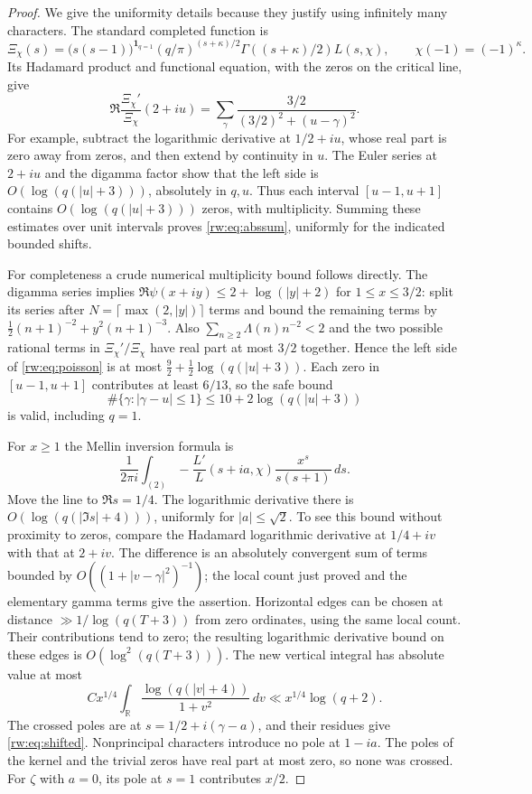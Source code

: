 \begin{proof}
We give the uniformity details because they justify using infinitely many
characters. The standard completed function is
\[
 \Xi_\chi(s)=\bigl(s(s-1)\bigr)^{\mathbf1_{q=1}}
 (q/\pi)^{(s+\kappa)/2}\Gamma((s+\kappa)/2)L(s,\chi),
 \qquad \chi(-1)=(-1)^\kappa.
\]
Its Hadamard product and functional equation, with the zeros on the
critical line, give
\begin{equation}\label{rw:eq:poisson}
 \Re\frac{\Xi_\chi'}{\Xi_\chi}(2+iu)
 =\sum_\gamma\frac{3/2}{(3/2)^2+(u-\gamma)^2}.
\end{equation}
For example, subtract the logarithmic derivative at $1/2+iu$, whose real
part is zero away from zeros, and then extend by continuity in $u$.
The Euler series at $2+iu$ and the digamma factor show that the left side
is $O(\log(q(|u|+3)))$, absolutely in $q,u$. Thus each interval
$[u-1,u+1]$ contains $O(\log(q(|u|+3)))$ zeros, with multiplicity.
Summing these estimates over unit intervals proves
\eqref{rw:eq:abssum}, uniformly for the indicated bounded shifts.

For completeness a crude numerical multiplicity bound follows directly.
The digamma series implies
$\Re\psi(x+iy)\le2+\log(|y|+2)$ for $1\le x\le3/2$:
split its series after $N=\lceil\max(2,|y|)\rceil$ terms and bound the
remaining terms by $\tfrac12(n+1)^{-2}+y^2(n+1)^{-3}$.
Also $\sum_{n\ge2}\Lambda(n)n^{-2}<2$ and the two possible rational
terms in $\Xi_\chi'/\Xi_\chi$ have real part at most $3/2$ together.
Hence the left side of \eqref{rw:eq:poisson} is at most
$\tfrac92+\tfrac12\log(q(|u|+3))$. Each zero in $[u-1,u+1]$ contributes
at least $6/13$, so the safe bound
\begin{equation}\label{rw:eq:localcount}
 \#\{\gamma:|\gamma-u|\le1\}
 \le10+2\log(q(|u|+3))
\end{equation}
is valid, including $q=1$.

For $x\ge1$ the Mellin inversion formula is
\[
 \frac1{2\pi i}\int_{(2)}
 -\frac{L'}{L}(s+ia,\chi)\frac{x^s}{s(s+1)}\,ds.
\]
Move the line to $\Re s=1/4$. The logarithmic derivative there is
$O(\log(q(|\Im s|+4)))$, uniformly for $|a|\le\sqrt2$.
To see this bound without proximity to zeros, compare the Hadamard
logarithmic derivative at $1/4+iv$ with that at $2+iv$. The difference
is an absolutely convergent sum of terms bounded by
$O((1+|v-\gamma|^2)^{-1})$; the local count just proved and the elementary
gamma terms give the assertion. Horizontal edges can be chosen at
distance $\gg1/\log(q(T+3))$ from zero ordinates, using the same local
count. Their contributions tend to zero; the resulting logarithmic
derivative bound on these edges is $O(\log^2(q(T+3)))$.
The new vertical integral has absolute value at most
\[
 Cx^{1/4}\int_{\mathbb R}
 \frac{\log(q(|v|+4))}{1+v^2}\,dv
 \ll x^{1/4}\log(q+2).
\]
The crossed poles are at $s=1/2+i(\gamma-a)$, and their residues give
\eqref{rw:eq:shifted}. Nonprincipal characters introduce no pole at
$1-ia$. The poles of the kernel and the trivial zeros have real part
at most zero, so none was crossed. For $\zeta$ with $a=0$, its pole
at $s=1$ contributes $x/2$.
\end{proof}

